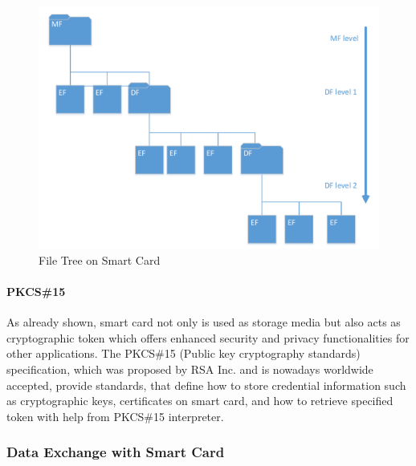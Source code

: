 \documentclass[]{llncs}
\begin{document}
\begin{figure}[!htbp]
	\centering
	\includegraphics[width=1.0\textwidth]{file-structure}
		\caption[ ]{File Tree on Smart Card\cite{handbuch}}
	\label{fig:file-structure}
\end{figure}

\paragraph{PKCS{\#}15}
As already shown, smart card not only is used as storage media but also acts as cryptographic token which offers enhanced security and privacy functionalities for other applications. The PKCS\#15 (Public key cryptography standards) specification\cite{pkcs}, which was proposed by RSA Inc. and is nowadays worldwide accepted, provide standards, that define how to store credential information such as cryptographic keys, certificates on smart card, and how to retrieve specified token with help from PKCS\#15 interpreter.
 
\subsubsection{Data Exchange with Smart Card}
\end{document}
